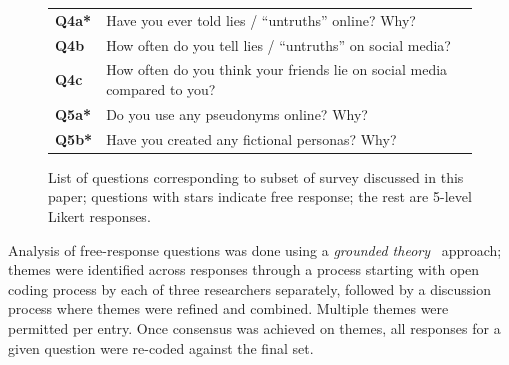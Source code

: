 \documentclass{sig-alternate}
\begin{document}
\begin{figure}[tbp]
    \begin{tabular}{ l | p{7cm} }
    \small
      {\bf Q4a*} & Have you ever told lies / ``untruths'' online? Why? \\
      {\bf Q4b} & How often do you tell lies / ``untruths'' on social media? \\
      {\bf Q4c} & How often do you think your friends lie on social media compared to you? \\      
      {\bf Q5a*} & Do you use any pseudonyms online? Why? \\
      {\bf Q5b*} & Have you created any fictional personas? Why?
    \end{tabular}
    \caption{%
    	List of questions corresponding to subset of survey discussed in this paper; questions with stars indicate free response; the rest are 5-level Likert responses. 
     }%
   \label{fig:questionnaire}
   \vspace{0.25cm}
\end{figure}




Analysis of free-response questions was done using a \emph{grounded theory}~\cite{strauss1990basics} approach; themes were identified across responses through a process starting with open coding process by each of three researchers separately, followed by a discussion process where themes were refined and combined. Multiple themes were permitted per entry. Once consensus was achieved on themes, all responses for a given question were re-coded against the final set.
\end{document}

